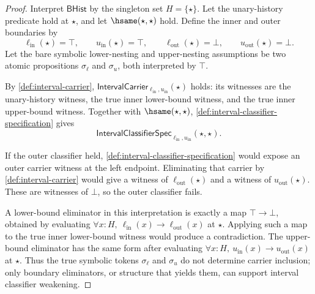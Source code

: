 \begin{proof}
Interpret $\mathsf{BHist}$ by the singleton set $H=\{\star\}$. Let the unary-history predicate hold at $\star$, and let $\hsame(\star,\star)$ hold. Define the inner and outer boundaries by
$$
\ell_{\mathrm{in}}(\star)=\top,\qquad
u_{\mathrm{in}}(\star)=\top,\qquad
\ell_{\mathrm{out}}(\star)=\bot,\qquad
u_{\mathrm{out}}(\star)=\bot.
$$
Let the bare symbolic lower-nesting and upper-nesting assumptions be two atomic propositions $\sigma_{\ell}$ and $\sigma_{u}$, both interpreted by $\top$.

By \autoref{def:interval-carrier}, $\mathsf{IntervalCarrier}_{\ell_{\mathrm{in}},u_{\mathrm{in}}}(\star)$ holds: its witnesses are the unary-history witness, the true inner lower-bound witness, and the true inner upper-bound witness. Together with $\hsame(\star,\star)$, \autoref{def:interval-classifier-specification} gives
$$
\mathsf{IntervalClassifierSpec}_{\ell_{\mathrm{in}},u_{\mathrm{in}}}(\star,\star).
$$

If the outer classifier held, \autoref{def:interval-classifier-specification} would expose an outer carrier witness at the left endpoint. Eliminating that carrier by \autoref{def:interval-carrier} would give a witness of $\ell_{\mathrm{out}}(\star)$ and a witness of $u_{\mathrm{out}}(\star)$. These are witnesses of $\bot$, so the outer classifier fails.

A lower-bound eliminator in this interpretation is exactly a map $\top\to\bot$, obtained by evaluating $\forall x:H,\ \ell_{\mathrm{in}}(x)\to\ell_{\mathrm{out}}(x)$ at $\star$. Applying such a map to the true inner lower-bound witness would produce a contradiction. The upper-bound eliminator has the same form after evaluating $\forall x:H,\ u_{\mathrm{in}}(x)\to u_{\mathrm{out}}(x)$ at $\star$. Thus the true symbolic tokens $\sigma_{\ell}$ and $\sigma_{u}$ do not determine carrier inclusion; only boundary eliminators, or structure that yields them, can support interval classifier weakening.
\end{proof}
